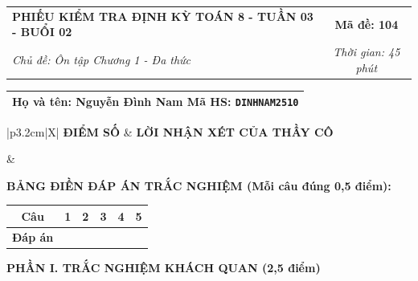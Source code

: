 \documentclass[12pt,a4paper]{article}
\begin{document}
\newpage


\noindent
\begin{tabularx}{\linewidth}{|X|c|}
\hline
\textbf{PHIẾU KIỂM TRA ĐỊNH KỲ TOÁN 8 - TUẦN 03 - BUỔI 02} & \textbf{Mã đề: 104} \\
\textit{Chủ đề: Ôn tập Chương 1 - Đa thức} & \textit{Thời gian: 45 phút} \\
\hline
\end{tabularx}

\vspace{1mm}

\noindent
\begin{tabularx}{\linewidth}{|X|}
\hline
\rule[-2mm]{0pt}{7.5mm}\textbf{Họ và tên:} \textbf{\large Nguyễn Đình Nam} \hfill \textbf{Mã HS:} \texttt{DINHNAM2510} \quad \\
\hline
\end{tabularx}

\vspace{1mm}

\noindent
\begin{tabularx}{\linewidth}{|p{3.2cm}|X|}
\hline
\centering\textbf{ĐIỂM SỐ} & \centering\textbf{LỜI NHẬN XÉT CỦA THẦY CÔ} \tabularnewline
\hline
\rule{0pt}{1.3cm} & \tabularnewline
\hline
\end{tabularx}

\vspace{1.2mm}

\noindent\textbf{BẢNG ĐIỀN ĐÁP ÁN TRẮC NGHIỆM (Mỗi câu đúng 0,5 điểm):}
\vspace{0.8mm}

\noindent
\renewcommand{\arraystretch}{1.35}
\begin{tabularx}{\linewidth}{|c|*{5}{>{\centering\arraybackslash}X|}}
\hline
\textbf{Câu} & \textbf{1} & \textbf{2} & \textbf{3} & \textbf{4} & \textbf{5} \\
\hline
\textbf{Đáp án} & & & & & \\
\hline
\end{tabularx}
\renewcommand{\arraystretch}{1.0}

\vspace{1.5mm}

\noindent\textbf{\large PHẦN I. TRẮC NGHIỆM KHÁCH QUAN (2,5 điểm)}
\vspace{1mm}
\end{document}
